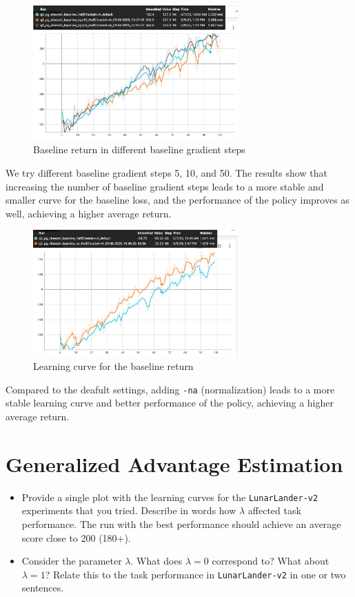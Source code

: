 \documentclass{article}
\begin{document}
\begin{figure}[H]
    \centering
    \includegraphics[width=0.7\textwidth]{img/HalfCheet_baseline_bgs_return.png}
    \caption{Baseline return in different baseline gradient steps}
    \label{fig:baseline_return_bgs}
\end{figure}
We try different baseline gradient steps 5, 10, and 50.
The results show that increasing the number of baseline gradient steps leads to a more stable and smaller curve for the baseline loss,
and the performance of the policy improves as well, achieving a higher average return.

\begin{figure}[H]
    \centering
    \includegraphics[width=0.7\textwidth]{img/HalfCheet_baseline_vs_na_return.png}
    \caption{Learning curve for the baseline return}
    \label{fig:baseline_vs_na_return}
\end{figure}
Compared to the deafult settings, adding \verb|-na| (normalization) leads to a more stable learning curve and better performance of the policy, achieving a higher average return. 

\newpage\section{Generalized Advantage Estimation}
\begin{itemize}
    \item Provide a single plot with the learning curves for the \verb|LunarLander-v2| experiments that you tried. Describe in words how $\lambda$ affected task performance. The run with the best performance should achieve an average score close to 200 (180+).
    \item Consider the parameter $\lambda$. What does $\lambda = 0$ correspond to? What about $\lambda = 1$? Relate this to the task performance in \verb|LunarLander-v2| in one or two sentences.
\end{itemize}
\end{document}
